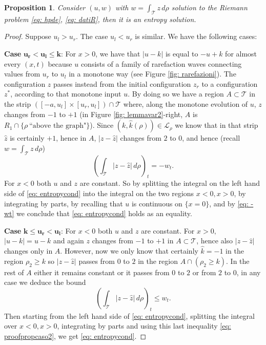 \documentclass[12pt]{article}
\newcommand{\LL}{\mathcal{L}}
\newcommand{\T}{\mathcal{T}}
\newcommand{\p}{\rho}
\newcommand{\1}{\mathds{1}}
\newtheorem{prop}[teo]{Proposition}
\theoremstyle{definition}
\begin{document}
\begin{prop}\label{prop: RPentropy}
    Consider $(u,w)$ with $w=\int_\T z \, d\p$ solution to the Riemann problem \eqref{eq: hpde}, \eqref{eq: datiR}, then it is an entropy solution. 
\end{prop}
\begin{proof}
    Suppose $u_l>u_r$. The case $u_l<u_r$ is similar. We have the following cases:\par
    \textbf{Case }$\boldsymbol{ u_r<u_l \leq k}$: For $x>0$, we have that $|u-k|$ is equal to $-u+k$ for almost every $(x,t)$ because $u$ consists of a family of rarefaction waves connecting values from $u_r$ to $u_l$ in a monotone way (see Figure \ref{fig: rarefazioni}). The configuration $z$ passes instead from the initial configuration $z_r$ to a configuration $z^*$, according to that monotone input $u$. By doing so we have a region $A\subset \T$ in the strip $([-a, u_l]\times [u_r,u_l]) \cap \T$ where, along the monotone evolution of $u$, $z$ changes from $-1$ to $+1$ (in Figure \ref{fig: lemmavar2}-right, $A$ is $R_1\cap\{\rho\ \mbox{``above the graph"}\}$). Since $(k,\hat{k}(\p))\in \LL_\p$ we know that in that strip $\hat{z}$ is certainly $+1$, hence in $A$, $|z-\hat{z}|$ changes from $2$ to $0$, and hence (recall $w=\int_\T z \,d\p$) 
    \begin{equation}\label{eq: -wt}
    \left(\int_\T |z-\hat{z}|\, d\p\right)_t = -w_t.
    \end{equation}
    For $x<0$ both $u$ and $z$ are constant. So by splitting the integral on the left hand side of \eqref{eq: entropycond} into the integral on the two regions $x<0, x>0$, by integrating by parts, by recalling that $u$ is continuous on $\{x=0\}$, and by \eqref{eq: -wt} we conclude that \eqref{eq: entropycond} holds as an equality.\par   
    \textbf{Case }$\boldsymbol{k\leq u_r<u_l}$: For $x<0$ both $u$ and $z$ are constant. For $x>0,$ $|u-k|=u-k$ and again $z$ changes from $-1$ to $+1$ in $A\subset \T$, hence also $|z-\hat{z}|$ changes only in $A$. However, now we only know that certainly $\hat{k} = -1$ in the region $\p_2 \geq k$ so $|z-\hat{z}|$ passes from $0$ to $2$ in the region $A\cap(\p_2 \geq k)$. In the rest of $A$ either it remains constant or it passes from $0$ to $2$ or from $2$ to $0$, in any case we deduce the bound \begin{equation}\label{eq: proofpropcaso2}
       \left(\int_\T |z-\hat{z}|\, d\p\right)_t \leq w_t.
   \end{equation} Then starting from the left hand side of \eqref{eq: entropycond}, splitting the integral over $x<0,x>0$, integrating by parts and using this last inequality \eqref{eq: proofpropcaso2}, we get \eqref{eq: entropycond}.\par

\end{proof}
\end{document}
